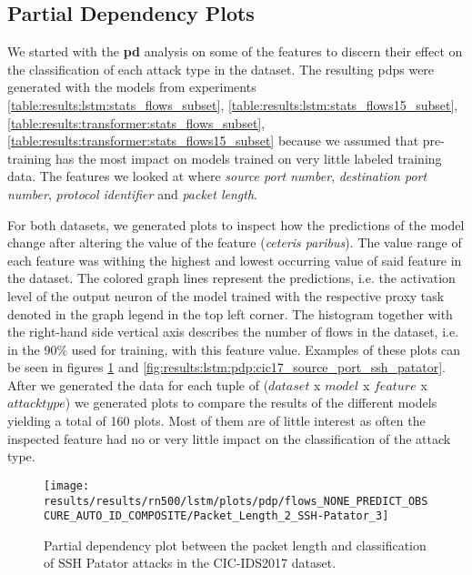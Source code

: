 \FloatBarrier

\subsection{Partial Dependency Plots} \label{sec:results:explainability:pdp}

We started with the \textbf{\gls{pd}} analysis on some of the features
to discern their effect on the classification of each attack type in the dataset. 
The resulting \glspl{pdp} were generated with the models from experiments \ref{table:results:lstm:stats_flows_subset},
\ref{table:results:lstm:stats_flows15_subset}, \ref{table:results:transformer:stats_flows_subset}, \ref{table:results:transformer:stats_flows15_subset} because we assumed that pre-training has the most impact on models trained on very little labeled training data. The features we looked at where \textit{source port number}, \textit{destination port number}, \textit{protocol identifier} and \textit{packet length}. \par
For both datasets, we generated plots to inspect how the predictions of the model change after altering the value of the feature (\textit{ceteris paribus}). The value range of each feature was withing the highest and lowest occurring value of said feature in the dataset. The colored graph lines represent the predictions, i.e. the activation level of the output neuron of the model trained with the respective proxy task denoted in the graph legend in the top left corner.
The histogram together with the right-hand side vertical axis describes the number of flows in the dataset, i.e. in the 90\% used for training, with this feature value. 
Examples of these plots can be seen in figures \ref{fig:results:lstm:pdp:cic17_packet_length_ssh_patator} and \ref{fig:results:lstm:pdp:cic17_source_port_ssh_patator}. After we generated the data for each tuple of ($dataset$ x $model$ x $feature$ x $attack type$) we generated plots to compare the results of the different models yielding a total of 160 plots. Most of them are of little interest as often the inspected feature had no or very little impact on the classification of the attack type. \par 

\begin{figure}[h]
	\centering
	\texttt{[image: results/results/rn500/lstm/plots/pdp/flows\_NONE\_PREDICT\_OBSCURE\_AUTO\_ID\_COMPOSITE/Packet\_Length\_2\_SSH-Patator\_3]}
	\caption{Partial dependency plot between the packet length and classification of SSH Patator attacks in the CIC-IDS2017 dataset.}
	\label{fig:results:lstm:pdp:cic17_packet_length_ssh_patator}
\end{figure}

